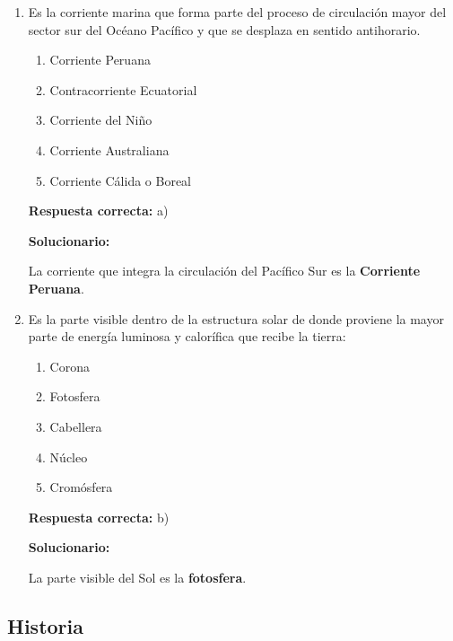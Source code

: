 \begin{enumerate}[resume]

	
	\item Es la corriente marina que forma parte del proceso de circulación mayor del sector sur del Océano Pacífico y que se desplaza en sentido antihorario.
	\begin{enumerate}[label=\alph*)]
		\item Corriente Peruana
		\item Contracorriente Ecuatorial
		\item Corriente del Niño
		\item Corriente Australiana
		\item Corriente Cálida o Boreal
	\end{enumerate}
	\textbf{Respuesta correcta:} a)
	
	\vspace{2mm}
	\textbf{Solucionario:}
	
	La corriente que integra la circulación del Pacífico Sur es la \textbf{Corriente Peruana}.
	
	\vspace{6mm}
	
	\item Es la parte visible dentro de la estructura solar de donde proviene la mayor parte de energía luminosa y calorífica que recibe la tierra:
	\begin{enumerate}[label=\alph*)]
		\item Corona
		\item Fotosfera
		\item Cabellera
		\item Núcleo
		\item Cromósfera
	\end{enumerate}
	\textbf{Respuesta correcta:} b)
	
	\vspace{2mm}
	\textbf{Solucionario:}
	
	La parte visible del Sol es la \textbf{fotosfera}.
	
	\vspace{6mm}
	
\end{enumerate}

\subsection*{Historia}

